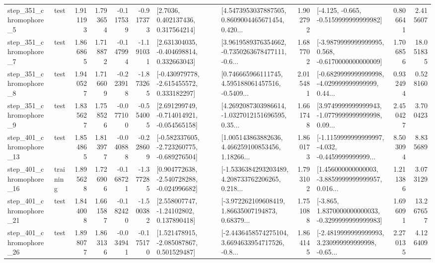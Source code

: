 \begin{tabular}{llrrrrllrlrr}
   step\_351\_chromophore\_5 &      test &      1.911193 &    1.793654 &     -0.117539 & -0.917373 &          [2.7036, 0.402137436, 0.317564214] &  [4.5473953037887505, 0.8609004465671454, 0.420... &       1.902792 &              [-4.125, -0.665, -0.5159999999999982] &            0.806641 &          2.415607 \\
   step\_351\_chromophore\_7 &      test &      1.866865 &    1.718872 &     -0.147994 & -1.191031 &    [2.631304035, -0.404698814, 0.332663043] &  [3.9619589376354662, -0.7350263678477111, -0.6... &       1.687702 &  [-3.9879999999999995, 0.568, -0.6170000000000009] &            1.706856 &         18.051835 \\
   step\_351\_chromophore\_8 &      test &      1.940527 &    1.716609 &     -0.223918 & -1.873265 &   [-0.430979778, -2.615455572, 0.333182297] &  [0.746665966111745, 4.595188061457516, -0.5409... &       2.015481 &  [-0.6829999999999998, -4.029999999999999, 0.44... &            0.932494 &          0.528160 \\
   step\_351\_chromophore\_9 &      test &      1.835627 &    1.758526 &     -0.077100 & -0.554005 &   [2.691299749, -0.714014921, -0.054565158] &  [4.2692087303986614, -1.0327012151696595, 0.35... &       1.661748 &  [3.9749999999999943, -1.0779999999999998, 0.09... &            2.450427 &          3.700423 \\
  step\_401\_chromophore\_13 &      test &      1.854865 &    1.813977 &     -0.040888 & -0.228609 &  [-0.582337605, -2.723260775, -0.689276504] &  [1.005143863882636, 4.466259100853456, 1.18266... &       1.860173 &  [-1.1159999999999997, -4.032, -0.4459999999999... &            8.503094 &          8.835689 \\
  step\_401\_chromophore\_16 &  training &      1.895628 &    1.726906 &     -0.168721 & -1.377285 &   [0.904772638, -2.540728288, -0.024996682] &  [-1.5336384293203489, 4.208733762206265, 0.218... &       1.793102 &  [1.456000000000003, -3.8859999999999957, 0.016... &            1.211386 &          3.073129 \\
  step\_401\_chromophore\_21 &      test &      1.844008 &    1.661587 &     -0.182420 & -1.500382 &     [2.558007747, -1.24102802, 0.137890418] &  [-3.972262109608419, 1.86635007194873, 0.68379... &       1.751088 &  [-3.865, 1.8370000000000033, -0.3299999999999983] &            1.696091 &         13.267657 \\
  step\_401\_chromophore\_26 &      test &      1.898077 &    1.863136 &     -0.034941 & -0.175170 &    [1.521478915, -2.085087867, 0.501529487] &  [-2.4436458574275104, 3.6694633954717526, -0.8... &       1.864145 &  [-2.4819999999999993, 3.230999999999998, -0.65... &            2.270135 &          4.126409 \\

\end{tabular}
